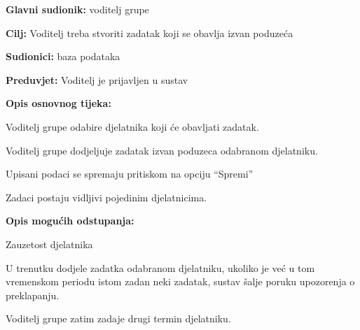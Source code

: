 			\eject
			\noindent {}
			\begin{packed_item}
				\item \textbf{Glavni sudionik: } voditelj grupe
				\item  \textbf{Cilj:} Voditelj treba stvoriti zadatak koji se obavlja izvan poduzeća 
				\item  \textbf{Sudionici:} baza podataka
				\item  \textbf{Preduvjet:} Voditelj je prijavljen u sustav
				\item  \textbf{Opis osnovnog tijeka:}
				\item[] \begin{packed_enum}
					\item Voditelj grupe odabire djelatnika koji će obavljati zadatak. 
					\item Voditelj grupe dodjeljuje zadatak izvan poduzeca odabranom djelatniku.
					\item Upisani podaci se spremaju pritiskom na opciju “Spremi” 
					\item Zadaci postaju vidljivi pojedinim djelatnicima. 
				\end{packed_enum}
				\item  \textbf{Opis mogućih odstupanja:}
				\item[] \begin{packed_item}
					\item[2.a] Zauzetost djelatnika
					\item[] \begin{packed_enum}
						\item U trenutku dodjele zadatka odabranom djelatniku, ukoliko je već u tom vremenskom periodu istom zadan neki zadatak, sustav šalje poruku upozorenja o preklapanju. 
						\item Voditelj grupe zatim zadaje drugi termin djelatniku. 
					\end{packed_enum}
				\end{packed_item}
			\end{packed_item}
			\noindent {}
